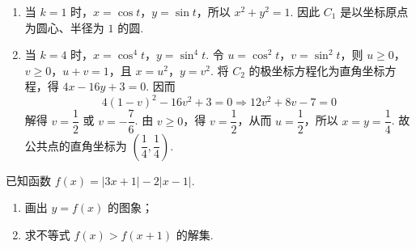 \begin{solution}
\begin{enumerate}
\item 当 \(k=1\) 时，\(x=\cos t\)，\(y=\sin t\)，所以 \(x^2+y^2=1\). 因此 \(C_1\) 是以坐标原点为圆心、半径为 \(1\) 的圆.

\item 当 \(k=4\) 时，\(x=\cos^4t\)，\(y=\sin^4t\). 令 \(u=\cos^2t\)，\(v=\sin^2t\)，则 \(u\ge0\)，\(v\ge0\)，\(u+v=1\)，且 \(x=u^2\)，\(y=v^2\). 将 \(C_2\) 的极坐标方程化为直角坐标方程，得 \(4x-16y+3=0\). 因而
\[
4(1-v)^2-16v^2+3=0\Longrightarrow 12v^2+8v-7=0
\]
解得 \(v=\dfrac{1}{2}\) 或 \(v=-\dfrac{7}{6}\). 由 \(v\ge0\)，得 \(v=\dfrac{1}{2}\)，从而 \(u=\dfrac{1}{2}\)，所以 \(x=y=\dfrac{1}{4}\). 故公共点的直角坐标为 \(\left(\dfrac{1}{4},\dfrac{1}{4}\right)\).
\end{enumerate}
\end{solution}

\begin{problem}
已知函数 \(f(x)=\left\lvert 3x+1 \right\rvert-2\left\lvert x-1 \right\rvert\).

\begin{enumerate}
\item 画出 \(y=f(x)\) 的图象；

\item 求不等式 \(f(x)>f(x+1)\) 的解集.
\end{enumerate}

\end{problem}

